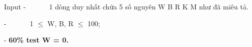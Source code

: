 Input
-       1 dòng duy nhất chứa 5 số nguyên W B R K M như đã miêu tả.  

   -       1  $\le$  W, B, R  $\le$  100;  

   -   \textbf{    60\% test W = 0.   }